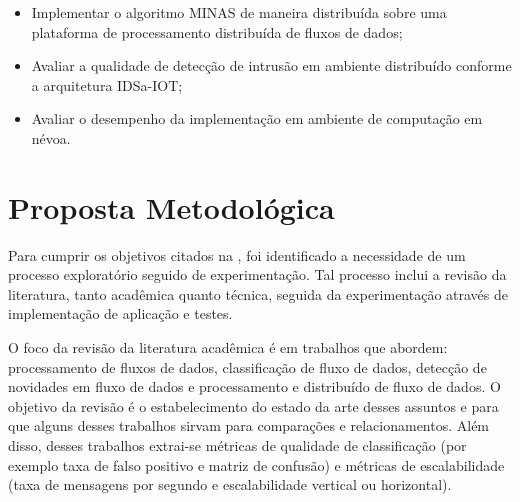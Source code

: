 \begin{itemize}

    \item Implementar o algoritmo MINAS de maneira distribuída sobre uma plataforma de processamento
    distribuída de fluxos de dados;

    \item Avaliar a qualidade de detecção de intrusão em ambiente distribuído 
    conforme a arquitetura IDSa-IOT;
    
    \item Avaliar o desempenho da implementação em ambiente de computação em névoa.

\end{itemize}


\section{Proposta Metodológica}


Para cumprir os objetivos citados na , foi identificado a necessidade
de um processo exploratório seguido de experimentação. Tal processo inclui a
revisão da literatura, tanto acadêmica quanto técnica, seguida da experimentação
através de implementação de aplicação e testes.

O foco da revisão da literatura acadêmica é em trabalhos que abordem:
processamento de fluxos de dados, classificação de fluxo de dados, detecção de
novidades em fluxo de dados e processamento e distribuído de fluxo de dados.
O objetivo da revisão é o estabelecimento do estado da arte desses assuntos
e para que alguns desses trabalhos sirvam para comparações e relacionamentos.
Além disso, desses trabalhos extrai-se métricas de qualidade de classificação
(por exemplo taxa de falso positivo e matriz de confusão) e métricas de
escalabilidade (taxa de mensagens por segundo e escalabilidade vertical ou
horizontal).

